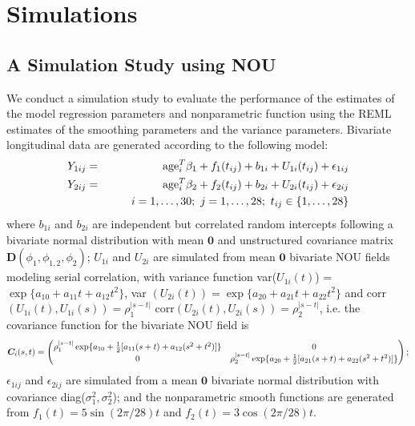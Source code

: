 \documentclass[review]{elsarticle}
\begin{document}
%
%
%

\section{Simulations} \label{simulation}

\subsection{A Simulation Study using NOU}
We conduct a  simulation study to evaluate the performance of the estimates of the model regression parameters and nonparametric function using the REML estimates of the smoothing parameters and the variance parameters. Bivariate  longitudinal data are generated according to the following model:
\begin{eqnarray*}
Y_{1ij} &=& {\rm age}_i^T  \beta_1 + f_1(t_{ij}) + b_{1i} + U_{1i}(t_{ij}) + \epsilon_{1ij}  \\
Y_{2ij} &=& {\rm age}_i^T  \beta_2 + f_2(t_{ij}) + b_{2i} + U_{2i}(t_{ij}) + \epsilon_{2ij} \\
&& \quad\quad i = 1, \dots, 30; \ j = 1, \dots, 28; \ t_{ij} \in \{1, \dots, 28\}
\end{eqnarray*}
where $ b_{1i}$ and $ b_{2i}$ are independent but correlated random intercepts following a bivariate normal distribution with mean $\bm 0$ and unstructured covariance matrix $\bm D(\phi_1, \phi_{1,2}, \phi_2)$; $U_{1i}$ and $U_{2i}$ are simulated from mean $\bm 0$ bivariate NOU fields modeling serial correlation, with variance function 
var($U_{1i}(t)$) = $\exp\{a_{10} + a_{11}t + a_{12}t^2 \}$,
var
$
(U_{2i}(t)) = \exp\{a_{20} + a_{21}t + a_{22}t^2 \}
$
and 
corr$(U_{1i} (t), U_{1i}(s)) = \rho_1^{|s-t|}$
corr$(U_{2i} (t), U_{2i}(s)) = \rho_2^{|s-t|}$, i.e. the covariance function for the bivariate NOU field is 
\[
\boldsymbol C_i(s, t)
= 
\begin{pmatrix}
\rho_1^{|s-t|} \exp\{a_{10} + {1 \over 2}[a_{11}(s+t) + a_{12}(s^2+t^2)] \} &  0  \\
0 & \rho_2^{|s-t|}\exp\{a_{20} + {1 \over 2}[a_{21}(s+t) + a_{22}(s^2+t^2)]\}
\end{pmatrix};
\] 
$\epsilon_{1ij}$ and $\epsilon_{2ij}$ are simulated from a mean $\bm 0$ bivariate normal distribution with covariance diag($\sigma_1^2, \sigma_2^2$);
and the nonparametric smooth functions are generated from 
$f_1 (t) = 5 \sin\left({2\pi / 28}\right)t$ and
$f_2 (t) = 3 \cos\left({2\pi / 28}\right)t$.
\end{document}
